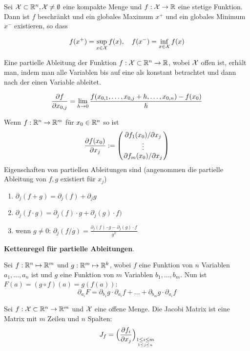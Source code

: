 
Sei $\mathcal{X} \subset \mathbb{R}^n, \mathcal{X} \neq \emptyset$ eine kompakte Menge und $f: \mathcal{X} \to \mathbb{R}$ eine stetige
Funktion. Dann ist $f$ beschränkt und ein globales Maximum $x^+$ und ein globales Minimum $x^-$
existieren, so dass

$$f(x^+) = \sup_{x \in \mathcal{X}} f(x), \quad f(x^-) = \inf_{x \in \mathcal{X}} f(x)$$



Eine partielle Ableitung der Funktion $f: \mathcal{X} \subset \mathbb{R}^n \to \mathbb{R}$, wobei $\mathcal{X}$ offen ist, erhält man, indem man 
alle Variablen bis auf eine als konstant betrachtet und dann nach der einen Variable ableitet.

$$\pdv{f}{x_{0, j}} = \lim_{h \to 0} \frac{f(x_{0, 1}, \dots, x_{0, j} + h, \dots, x_{0, n}) - f(x_0)}{h}$$

Wenn $f: \mathbb{R}^n \to \mathbb{R}^m$ für $x_0 \in \mathbb{R}^n$ so ist
\begin{align*}
  \pdv{f(x_0)}{x_j} := \begin{pmatrix}
    \pdv*{f_1(x_0)}{x_j}\\
    \vdots\\
    \pdv*{f_m(x_0)}{x_j}\\
  \end{pmatrix}
\end{align*}
Eigenschaften von partiellen Ableitungen sind (angenommen die partielle Ableitung von $f, g$ existiert für $x_j$)
\begin{enumerate}[label=(\arabic*)]
  \item $\partial_j(f + g) = \partial_j (f) + \partial_j g$
  \item $\partial_j(f \cdot g) = \partial_j (f) \cdot g + \partial_j (g) \cdot f)$
  \item wenn $g \neq 0$: $\partial_j(f / g) = \frac{\partial_j (f) \cdot g - \partial_j (g) \cdot f}{g^2}$
\end{enumerate}

\textbf{Kettenregel für partielle Ableitungen}.

Sei $f : \mathbb{R}^n \mapsto \mathbb{R}^m$ und $g: \mathbb{R}^m \mapsto \mathbb{R}^k$, wobei $f$ eine Funktion von $n$ Variablen $a_1,...,a_n$ ist 
und $g$ eine Funktion von $m$ Variablen $b_1, ..., b_m$. Nun ist $F(a) = (g \circ f)(a) = g(f(a))$:
$$\partial_{a_i} F = \partial_{b_1} g \cdot \partial_{a_i}f + ... + \partial_{b_m} g \cdot \partial_{a_i}f$$


Sei $f : \mathcal{X} \subset \mathbb{R}^n \to \mathbb{R}^m$ und $\mathcal{X}$ eine offene Menge. Die Jacobi Matrix ist eine Matrix mit $m$ Zeilen und $n$ Spalten:
$$J_f = \Big ( \pdv{f_i}{x_j} \Big ) \underset{\underset{1 \leq j \leq n}{1 \leq i \leq m}}{}$$


